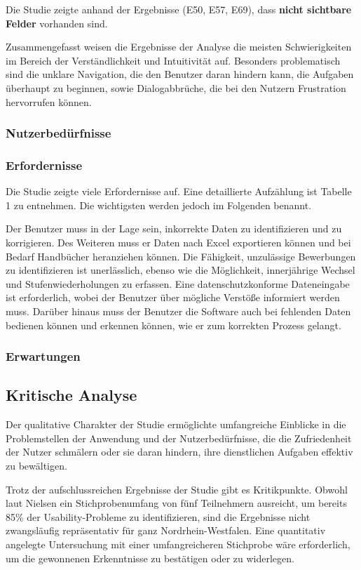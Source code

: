 Die Studie zeigte anhand der Ergebnisse (E50, E57, E69), dass \textbf{nicht sichtbare Felder} vorhanden sind.

Zusammengefasst weisen die Ergebnisse der Analyse die meisten Schwierigkeiten im Bereich der Verständlichkeit und Intuitivität auf. Besonders problematisch sind die unklare Navigation, die den Benutzer daran hindern kann, die Aufgaben überhaupt zu beginnen, sowie Dialogabbrüche, die bei den Nutzern Frustration hervorrufen können.

\subsubsection{Nutzerbedürfnisse}
\label{section-beduerfnisse}
\subsubsection{Erfordernisse}
Die Studie zeigte viele Erfordernisse auf. Eine detaillierte Aufzählung ist Tabelle 1 zu entnehmen. Die wichtigsten werden jedoch im Folgenden benannt.

Der Benutzer muss in der Lage sein, inkorrekte Daten zu identifizieren und zu korrigieren. Des Weiteren muss er Daten nach Excel exportieren können und bei Bedarf Handbücher heranziehen können. Die Fähigkeit, unzulässige Bewerbungen zu identifizieren ist unerlässlich, ebenso wie die Möglichkeit, innerjährige Wechsel und Stufenwiederholungen zu erfassen. Eine datenschutzkonforme Dateneingabe ist erforderlich, wobei der Benutzer über mögliche Verstöße informiert werden muss. Darüber hinaus muss der Benutzer die Software auch bei fehlenden Daten bedienen können und erkennen können, wie er zum korrekten Prozess gelangt.

\subsubsection{Erwartungen}





\subsection{Kritische Analyse}
Der qualitative Charakter der Studie ermöglichte umfangreiche Einblicke in die Problemstellen der Anwendung und der Nutzerbedürfnisse, die die Zufriedenheit der Nutzer schmälern oder sie daran hindern, ihre dienstlichen Aufgaben effektiv zu bewältigen. 

Trotz der aufschlussreichen Ergebnisse der Studie gibt es Kritikpunkte. Obwohl laut Nielsen ein Stichprobenumfang von fünf Teilnehmern ausreicht, um bereits 85\% der Usability-Probleme zu identifizieren\cite{Nielsen5Teilnehmer}, sind die Ergebnisse nicht zwangsläufig repräsentativ für ganz Nordrhein-Westfalen. Eine quantitativ angelegte Untersuchung mit einer umfangreicheren Stichprobe wäre erforderlich, um die gewonnenen Erkenntnisse zu bestätigen oder zu widerlegen.

